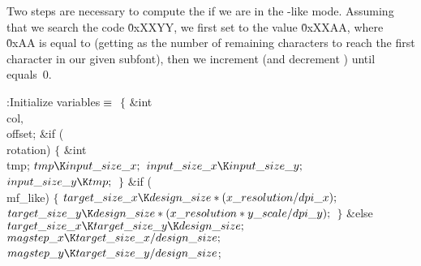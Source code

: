 Two steps are necessary to compute the  if we are in the \mf-like
mode. Assuming that we search the code \.{0xXXYY}, we first set 
to
the value \.{0xXXAA}, where \.{0xAA} is equal to  (getting
 as the number of remaining characters to reach the first
character
in our given subfont), then we increment  (and decrement )
until  equals~0.

\Y\B\4:Initialize variables\X${}\equiv{}$\6
${}\{{}$\1\6
\&{int} \\{col}${},{}$ \\{offset};\7
\&{if} (\\{rotation})\5
${}\{{}$\1\6
\&{int} \\{tmp};\7
${}\\{tmp}\K\\{input\_size\_x};{}$\6
${}\\{input\_size\_x}\K\\{input\_size\_y};{}$\6
${}\\{input\_size\_y}\K\\{tmp};{}$\6
\4${}\}{}$\2\7
\&{if} (\\{mf\_like})\5
${}\{{}$\1\6
${}\\{target\_size\_x}\K\\{design\_size}*(\\{x\_resolution}/\\{dpi\_x});{}$\6
${}\\{target\_size\_y}\K\\{design\_size}*(\\{x\_resolution}*\\{y\_scale}/\\{dpi%
\_y});{}$\6
\4${}\}{}$\2\6
\&{else}\1\5
${}\\{target\_size\_x}\K\\{target\_size\_y}\K\\{design\_size};{}$\2\6
${}\\{magstep\_x}\K\\{target\_size\_x}/\\{design\_size};{}$\6
${}\\{magstep\_y}\K\\{target\_size\_y}/\\{design\_size}{}$;\7
